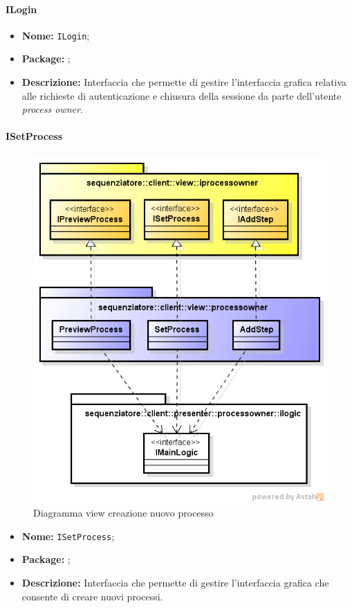 \paragraph{ILogin}
\begin{itemize}
\item \textbf{Nome:} \texttt{ILogin};
\item \textbf{Package:} \texttt{\iViewAdmin{}};
\item \textbf{Descrizione:} Interfaccia che permette di gestire l'interfaccia grafica relativa alle richieste di autenticazione e chiusura della sessione da parte dell'utente \textit{process owner}.
\end{itemize}

\paragraph{ISetProcess}
\begin{figure}[H] \centering \includegraphics[width=%
\textwidth]
{./pack/newProcess.png} \caption{Diagramma view creazione nuovo processo}
\end{figure}
\begin{itemize}
\item \textbf{Nome:} \texttt{ISetProcess};
\item \textbf{Package:} \texttt{\iViewAdmin{}};
\item \textbf{Descrizione:} Interfaccia che permette di gestire l'interfaccia grafica che consente di creare nuovi processi.
\end{itemize}

